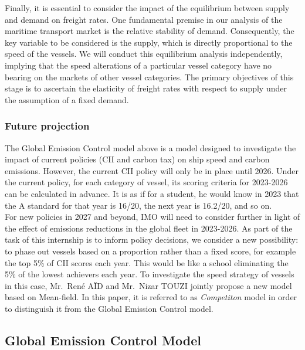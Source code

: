 \documentclass[a4paper,12pt]{article}
\begin{document}
Finally, it is essential to consider the impact of the equilibrium between supply and demand on freight rates.
One fundamental premise in our analysis of the maritime transport market is the relative stability of demand.
Consequently, the key variable to be considered is the supply, which is directly proportional to the speed of the vessels. We will conduct this equilibrium analysis independently, implying that the speed alterations of a particular vessel category have no bearing on the markets of other vessel categories.
The primary objectives of this stage is to ascertain the elasticity of freight rates with respect to supply under the assumption of a fixed demand.\\

\subsubsection{Future projection}
The Global Emission Control model above is a model designed to investigate the impact of current policies (CII and carbon tax) on ship speed and carbon emissions.
However, the current CII policy will only be in place until 2026.
Under the current policy, for each category of vessel, its scoring criteria for 2023-2026 can be calculated in advance.
It is as if for a student, he would know in 2023 that the A standard for that year is 16/20, the next year is 16.2/20, and so on.\\

For new policies in 2027 and beyond, IMO will need to consider further in light of the effect of emissions reductions in the global fleet in 2023-2026.
As part of the task of this internship is to inform policy decisions, we consider a new possibility: to phase out vessels based on a proportion rather than a fixed score, for example the top 5\% of CII scores each year.
This would be like a school eliminating the 5\% of the lowest achievers each year.
To investigate the speed strategy of vessels in this case, Mr.~René AÏD and Mr.~Nizar TOUZI jointly propose a new model based on Mean-field. In this paper, it is referred to as \textit{Competiton} model in order to distinguish it from the Global Emission Control model.

\subsection{Global Emission Control Model}
\end{document}
